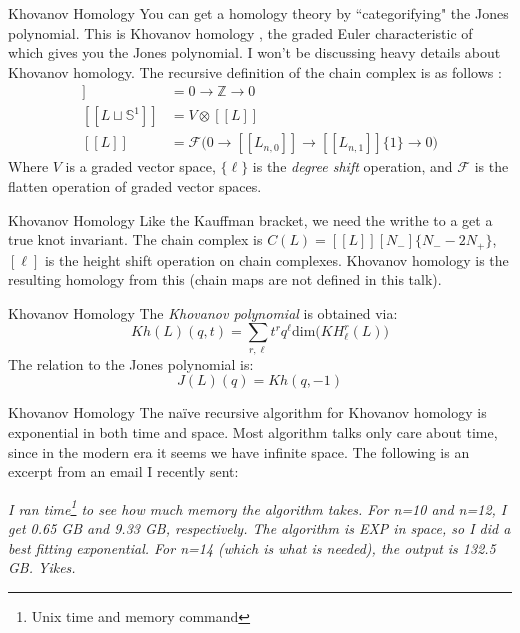 \documentclass{beamer}
\begin{document}
    \begin{frame}{Khovanov Homology}
        You can get a homology theory by ``categorifying" the Jones polynomial.
        This is Khovanov homology \cite{Khovanov1999CatJonesPoly},
        the graded Euler characteristic of which
        gives you the Jones polynomial. I won't be
        discussing heavy details about Khovanov homology.
        The recursive definition of the chain complex is as follows
        \cite[p.~338]{BarNatanKhovanovJones}:
        \begin{align}
            [[\emptyset]]&=0\rightarrow\mathbb{Z}\rightarrow{0}\\
            [[L\sqcup\mathbb{S}^{1}]]&=V\otimes[[L]]\\
            [[L]]&=\mathcal{F}\big(
                0\rightarrow[[L_{n,0}]]\rightarrow[[L_{n,1}]]\{1\}\rightarrow{0}
            \big)
        \end{align}
        Where $V$ is a graded vector space, $\{\ell\}$ is the
        \textit{degree shift} operation, and $\mathcal{F}$ is the flatten
        operation of graded vector spaces.
    \end{frame}
    \begin{frame}{Khovanov Homology}
        Like the Kauffman bracket, we need
        the writhe to a get a true knot invariant. The chain complex is
        $C(L)=[[L]][N_{-}]\{N_{-}-2N_{+}\}$, $[\ell]$ is the height shift
        operation on chain complexes. Khovanov homology is the resulting
        homology from this (chain maps are not defined in this talk).
    \end{frame}
    \begin{frame}{Khovanov Homology}
        The \textit{Khovanov polynomial} is obtained via:
	    \begin{equation}
	        Kh(L)(q,t)=
	        \sum_{r,\ell}t^{r}q^{\ell}\textrm{dim}\big(KH_{\ell}^{r}(L)\big)
	    \end{equation}
	    The relation to the Jones polynomial is:
	    \begin{equation}
	        J(L)(q)=Kh(q,-1)
	    \end{equation}
    \end{frame}
    \begin{frame}{Khovanov Homology}
        The na\"{i}ve recursive algorithm for Khovanov homology is exponential
        in both time and space. Most algorithm talks only care about time,
        since in the modern era it seems we have infinite space. The following
        is an excerpt from an email I recently sent:
        \begin{flushright}
            \textit{
                I ran time\footnote{Unix time and memory command}
                to see how much memory the algorithm takes.
                For n=10 and n=12, I get 0.65 GB and 9.33 GB, respectively.
                The algorithm is EXP in space, so I did a best fitting
                exponential. For n=14 (which is what is needed), the output is
                132.5 GB. Yikes.
            }
        \end{flushright}
    \end{frame}
\end{document}
